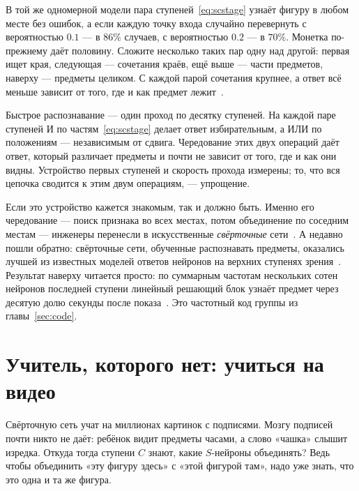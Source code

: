 В той же одномерной модели пара ступеней~\eqref{eq:scstage} узнаёт фигуру в любом месте без ошибок, а если каждую точку входа случайно перевернуть с вероятностью $0.1$ --- в $86\%$ случаев, с вероятностью $0.2$ --- в $70\%$. Монетка по-прежнему даёт половину. Сложите несколько таких пар одну над другой: первая ищет края, следующая --- сочетания краёв, ещё выше --- части предметов, наверху --- предметы целиком. С каждой парой сочетания крупнее, а ответ всё меньше зависит от того, где и как предмет лежит~\cite{Riesenhuber1999}.

\begin{keyblock}
\begin{proposition}
\label{prop:conveyor}
Быстрое распознавание --- один проход по десятку ступеней. На каждой паре ступеней И по частям~\eqref{eq:scstage} делает ответ избирательным, а ИЛИ по положениям --- независимым от сдвига. Чередование этих двух операций даёт ответ, который различает предметы и почти не зависит от того, где и как они видны. Устройство первых ступеней и скорость прохода измерены; то, что вся цепочка сводится к этим двум операциям, --- упрощение.
\end{proposition}
\end{keyblock}

Если это устройство кажется знакомым, так и должно быть. Именно его чередование --- поиск признака во всех местах, потом объединение по соседним местам --- инженеры перенесли в искусственные \emph{свёрточные} сети~\cite{Fukushima1980}. А недавно пошли обратно: свёрточные сети, обученные распознавать предметы, оказались лучшей из известных моделей ответов нейронов на верхних ступенях зрения~\cite{Yamins2014}. Результат наверху читается просто: по суммарным частотам нескольких сотен нейронов последней ступени линейный решающий блок узнаёт предмет через десятую долю секунды после показа~\cite{Hung2005}. Это частотный код группы из главы~\ref{sec:code}.

\section{Учитель, которого нет: учиться на видео}

Свёрточную сеть учат на миллионах картинок с подписями. Мозгу подписей почти никто не даёт: ребёнок видит предметы часами, а слово «чашка» слышит изредка. Откуда тогда ступени $C$ знают, какие $S$-нейроны объединять? Ведь чтобы объединить «эту фигуру здесь» с «этой фигурой там», надо уже знать, что это одна и та же фигура.

